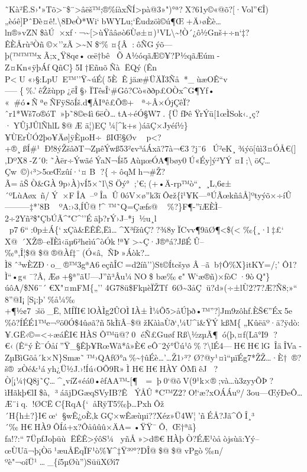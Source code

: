 ˜Kà²Ë.S›"»Tõ\textgreater¨\$¨\textgreater âëš™;®\%íàxÑÍ\textgreater pà@3»")°ª?X?61y©«@õ?­{[}·Vol''€Î)„èóê{]}PˆÐè¤ê!.\textbackslash8ÐeÒ*Wi`bWYLu;`Ê udzöì©ú¶Œ+Ä›øÈè\ldots ln®»vZN\$àÚ×xf·¬\textasciitilde{[}\textgreater ùŸââøò6Ùø±¤)¹VL\textbackslash\textasciitilde!Ò´¿ô½Gnš+÷n`‡?ÊÈÅrù³Òñ©×''zÃ\textgreater\textasciitilde N\$`\%¤\{Â:ôÑGýõ---þ(™™™xÃ;x¸Ÿ8q¢•œë†bêÕA½óqãÆ©¥?P\textbar½qãÆúm-Z¤Kn«ÿþÁƒQñC\}5I†EñuõÑàËQý(Ên
\textquotesingle P\textlessU«›§:LpUE™''Ÿ\textasciitilde úÉ(5ÈÊjäæ\#ÜÄÏ3Ñå*\_\textbarùæOÊ``v-----\{\%.'êŽ žùpp¿ëÎ§›ÏTêsÎ`\#Gô?Cò«ððp£OÒx\^{}G¶Yƒ•
«\#ó•ÑªeÑFÿSõÍš.d¶ÅIªê£Õ®+ 
ª÷Â×ÓjÇêÏ?ˆr1*Wš7o®óT~»þ˜8©e4ì6ëÒ\ldotstA÷éÓ§W7.
\{ÜfÞêŸrÝü{[}1œÌSok‹.¸ç?·YÛjJÛlÑhlL\$@Æ
ä¦)EÇ¼{[}\^{}k+s)áãÇ×Jyéí½\}¥ÙErÙÓ2þo¥Äø{]}ÿÈµoH÷ßI\textbar Œ§Ø\textquotesingle v
p\textless?+®¸ßÍ\#¹\textbarÐ!8ýŽšâðT¬ZµêÝwß53²¢v³áÁxã?7à¬€3?j¨6Ú²eK¸¾ýö{[}ûì3¤ÓÅ€({]}‚DºX8\textbar-Z´0:˜Àër÷ÝwãéÝa N¬Íš5AùµœÓA¶bøy0Ú«Éy{]}ý²YÝ¤I;\textbackslashöÇ\ldots Çw~©)‹³\textgreater5œŒzûí·`¤B
?\{÷ôqMh¬\#Ž?Ã=åŠÒ\&GÀ9p›À)vÍ5×˜l\textbackslash SÖý°;'€;(+•Ä-rp™ò``¸¸L,6¢±´ºLùAøx~ñ/Ý×FÎA~--ºÎa
­
Û0óV×ø''k3ïÔ\textquotesingle¢\textbar ž\{î¹¥K---ªÚÃœkñâÅ{]}ºtyýõ×÷íÛ---------‡*'8BºA:›3‚ÍÛ@!\^{}
™˜Q=Çæƒs@
\%?\}F¶-''ïÆÈÌ--2÷2Yñ²\$"ÇbÚÃ\textquotesingle@Z\^{}"C\^{}''Éäþ?rÝ›J--*j½u¸l
p76``:0p±Á\{`\textquotesingle xÇà\&ËÊÊ‚Ëì\ldots\^{}X³fžûÇ??¾8yÏCvv¶9ãØ¶\textless\$(\textless{}
\textquotesingle‰\{¸·l‡£` 
X@~´XŽ®--eÏÈì‹äµ6²h¢ìú\^{}òÓk!ª¥\textgreater\textasciitilde Ç·J®ªá?JßÉÛ--‰ª, Î¦\$@\$@®@Àf‡¯(Ó«â‚ÑÞ»Áòk?\textbar\ldots\textbar Ì8ˆ³wÈZÐ·o\_®™3gªA6eçñÎC=d2íñ'')St©Ítcšyø
Â--ãb†Ô\%X\}itKY=/;'  Ô1?Ì``•g«¯?Â,Æø+§ª''ãU---J''ñ³Âu¼NO\$
bæ‰¢"W\textquotesingle`æ­®ñ)×fòC·9òQ"\}úôA/\$N6¨´€X"¤mFM\{„''
4G78ü\$FkµèÏŽT ƒ6Ø\textasciitilde3åÇü?d»(÷±lÙ2?7?Æ?Ñ8;»`` 
8''@I¡{[}S¡:þ'\%å¼‰+¶½¢7~:šö\_Ë‚MÍÏI€lOÀÌg2ÛOÌIÀ±Ì¼Õ5\textgreater åÚþð•™''?{]}Jm9zôhƒ.ÈŠ€''Éx5e~\%ô?ÍÉÉ1™e¬ºö0Ó\$4ûøã?ñ5kÌïÂ--\$@žKàìaÙð`,¼U\^{}i\&ŸÝ
kß­M\{„Kûëäº·ä?ÿdò:¥.GË‹©=\textless÷æáÊI€HÀS Ô™ü@?0
éÑ£GuøƒRß\textbackslash½zµÃ¶ó(þ‚¤f(Lã°I9
?€‹(Ê``ýÈ¯Óåí''Ÿ\_§Êþ¥RœWã*â»È€eÔ¯2ý°Üú¹ô\%?\textbackslash lÉ4---H€H€lG~ÎäÎVa­ZµBìGõå´k×N\}Smæ˜™›QAfØ°a\%\textasciitilde†ûÉè\ldots'\ldots Ž1›³? 
Ø?@y¹¤ì``µïÉg7*ŽŽ\ldots·È†®?š®~zÒé\&¹áyh¿Ü½J.›!Íú‹OÕ9R»Ì H€H€HÀY ÔMìêJ?
Ò{[}¡¼†Q8j˜Ç\ldots\^{}¸víZ«éá0•êfAA™-{[}¶~~=þ0`@õV(9¹k×®;và\ldots ù3zyyÕÞ?ìHãkþ€lI\$à,
³áãjDGæqSVyIB?Ê
ÝÅÛ*C™Z2?\textquotesingleO!{}`æ?xOÁÁuº/3ou---ŒýÐeÔ\ldots Æ¨iq.!ØCËC\{\textbar RqA\{`åRÿT5‰þ\ldots PxhÔž´H\{h±?\}I€œ` §wÊ¿oÈ‚kGÇ×wÊæùµi??Xéz»Ü4W¦'ñÉÅ?Jã\^{}ÔÎ¸³´‰H€HÀ9ÔÍá+x?Ôåûûû×ÄA=•ŸŸ¯Ô‚Œ†ªã\}ƒa!?:``7ÜpƒJoþüùËÊÊ\textgreater ýôS¼yñÅ»\textgreater d®€HÀþÒ?ÉÆ¹òåòjsùä:Yý--œÙUã¬þ¡Òö¹æuÅËqÏF¹ò\%¥\^{}‡Ÿ³\textquotesingle º°?DÎ@\$@\$@v\textquotesingle Pgò‰n/ºè"¬oîÜ¹\ldots\_\{í5µØù'')SüüX\textquotesingle Øî7\textquotesingle{}
